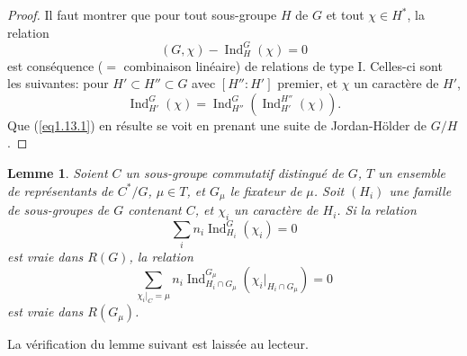\documentclass[11pt,a4paper]{amsart}
\theoremstyle{plain}
\newtheorem{lemma}[theorem]{Lemme}
\theoremstyle{definition}
\DeclareMathOperator{\Ind}{Ind}
\begin{document}
\begin{proof}
Il faut montrer que pour tout sous-groupe $H$ de $G$ et tout $\chi \in H^{*}$, la relation
\begin{equation}\label{eq1.13.1}
(G,\chi) - \Ind_{H}^{G}(\chi) = 0
\end{equation}
est cons\'equence ($=$ combinaison lin\'eaire) de relations de type I. Celles-ci sont les suivantes: pour $H' \subset H'' \subset G$ avec $[H'':H']$ premier, et $\chi$ un caract\`ere de $H'$,
\[
\Ind_{H'}^{G}(\chi) = \Ind_{H''}^{G}(\Ind_{H'}^{H''}(\chi)).
\]
Que (\ref{eq1.13.1}) en r\'esulte se voit en prenant une suite de Jordan-H\"older de $G/H$.
\end{proof}

\begin{lemma}\label{lem1.13.2}
Soient $C$ un sous-groupe commutatif distingu\'e de $G$, $T$ un ensemble de repr\'esentants de $C^{*}/G$, $\mu \in T$, et $G_{\mu}$ le fixateur de $\mu$. Soit $(H_{i})$ une famille de sous-groupes de $G$ contenant $C$, et $\chi_{i}$ un caract\`ere de $H_{i}$. Si la relation
\[
\sum_{i} n_{i} \Ind_{H_{i}}^{G}(\chi_{i}) = 0
\]
est vraie dans $R(G)$, la relation
\[
\sum_{\chi_{i}|_{C} = \mu} n_{i} \Ind_{H_{i} \cap G_{\mu}}^{G_{\mu}}(\chi_{i}|_{H_{i} \cap G_{\mu}}) = 0
\]
est vraie dans $R(G_{\mu})$.
\end{lemma}

La v\'erification du lemme suivant est laiss\'ee au lecteur.
\end{document}
